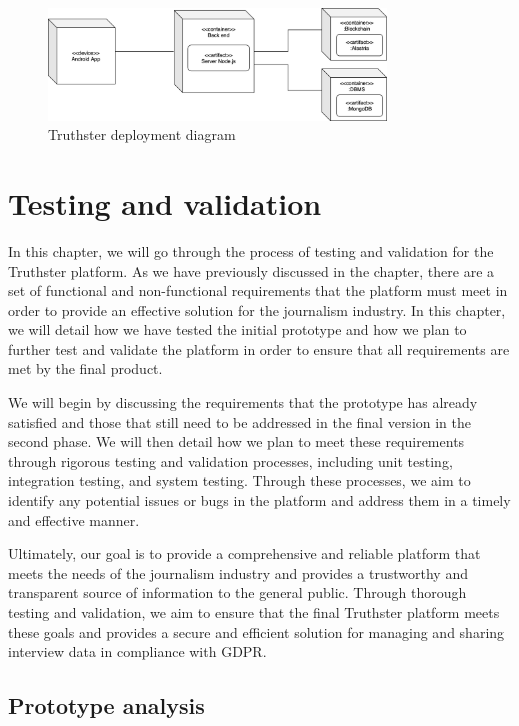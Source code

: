 \documentclass[target=mst,aauheader=]{thud}
\begin{document}
\begin{figure}
    \centering
    \includegraphics[width=0.8\textwidth]{images/deploymentDiagram.png}
    \caption{Truthster deployment diagram}
    \label{fig:deploymentDiagram}
\end{figure}

\chapter{Testing and validation}
\label{chapter:testingAndValidation}

In this chapter, we will go through the process of testing and validation for the Truthster platform. As we have previously discussed in the  chapter, there are a set of functional and non-functional requirements that the platform must meet in order to provide an effective solution for the journalism industry. In this chapter, we will detail how we have tested the initial prototype and how we plan to further test and validate the platform in order to ensure that all requirements are met by the final product.

We will begin by discussing the requirements that the prototype has already satisfied and those that still need to be addressed in the final version in the second phase. We will then detail how we plan to meet these requirements through rigorous testing and validation processes, including unit testing, integration testing, and system testing. Through these processes, we aim to identify any potential issues or bugs in the platform and address them in a timely and effective manner.

Ultimately, our goal is to provide a comprehensive and reliable platform that meets the needs of the journalism industry and provides a trustworthy and transparent source of information to the general public. Through thorough testing and validation, we aim to ensure that the final Truthster platform meets these goals and provides a secure and efficient solution for managing and sharing interview data in compliance with GDPR.

\section{Prototype analysis}
\end{document}
